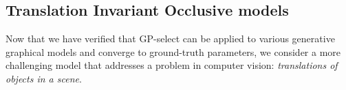 
\subsection{Translation Invariant Occlusive models}
\label{invec}



Now that we have verified that GP-select can be applied to various generative graphical models and converge to ground-truth parameters, we consider a more challenging model that addresses a problem in computer vision: \emph{translations of objects in a scene}.

